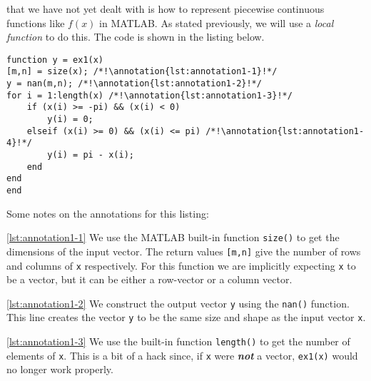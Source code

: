  that we have not yet dealt with is how to represent piecewise continuous functions like $f(x)$ in MATLAB.  As stated previously, we will use a \emph{local function} to do this.  The code is shown in the listing below.

\begin{lstlisting}[name=lec17-ex1]
%% Local functions 
function y = ex1(x) 
[m,n] = size(x); /*!\annotation{lst:annotation1-1}!*/
y = nan(m,n); /*!\annotation{lst:annotation1-2}!*/
for i = 1:length(x) /*!\annotation{lst:annotation1-3}!*/
    if (x(i) >= -pi) && (x(i) < 0) 
        y(i) = 0;
    elseif (x(i) >= 0) && (x(i) <= pi) /*!\annotation{lst:annotation1-4}!*/
        y(i) = pi - x(i);
    end
end
end
\end{lstlisting} \setcounter{lstannotation}{0}
Some notes on the annotations for this listing:

\vspace{0.25cm}

\noindent \ref{lst:annotation1-1}  We use the MATLAB built-in function \lstinline{size()} to get the dimensions of the input vector.  The return values \lstinline{[m,n]} give the number of rows and columns of \lstinline{x} respectively. For this function we are implicitly expecting \lstinline{x} to be a vector, but it can be either a row-vector or a column vector.

\vspace{0.25cm}

\noindent \ref{lst:annotation1-2} We construct the output vector \lstinline{y} using the \lstinline{nan()} function.  This line creates the vector \lstinline{y} to be the same size and shape as the input vector \lstinline{x}.  


\vspace{0.25cm}

\noindent \ref{lst:annotation1-3} We use the built-in function \lstinline{length()} to get the number of elements of \lstinline{x}.  This is a bit of a hack since, if \lstinline{x} were \textbf{\emph{not}} a vector, \lstinline{ex1(x)} would no longer work properly.

